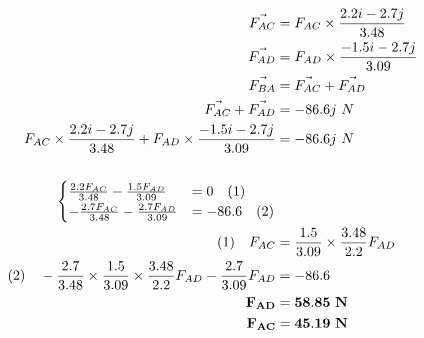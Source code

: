 \documentclass{article}
\begin{document}
\begin{align*}
    \vec{F_{AC}}                                                                                           & = F_{AC} \times \frac{2.2i-2.7j}{3.48}         \\
    \vec{F_{AD}}                                                                                           & = F_{AD} \times \frac{-1.5i-2.7j}{3.09}        \\
    \vec{F_{BA}}                                                                                           & =  \vec{F_{AC}} + \vec{F_{AD}}                 \\
    \vec{F_{AC}} + \vec{F_{AD}}                                                                            & =  -86.6j\ N                                   \\
    F_{AC} \times \frac{2.2i-2.7j}{3.48} + F_{AD} \times \frac{-1.5i-2.7j}{3.09}                           & = -86.6j\ N                                    \\ \hrulefill \\
    \begin{cases}
        \frac{2.2F_{AC}}{3.48} - \frac{1.5F_{AD}}{3.09}  & = 0\quad(1)     \\
        -\frac{2.7F_{AC}}{3.48} - \frac{2.7F_{AD}}{3.09} & = -86.6\quad(2)
    \end{cases}                                              \\
    (1)\quad F_{AC}                                                                                        & =\frac{1.5}{3.09}\times\frac{3.48}{2.2} F_{AD} \\
    (2)\quad -\frac{2.7}{3.48}\times\frac{1.5}{3.09}\times\frac{3.48}{2.2} F_{AD} - \frac{2.7}{3.09}F_{AD} & = -86.6                                        \\
    \mathbf{F_{AD}}                                                                                        & =  \mathbf{58.85\ N}                           \\
    \mathbf{F_{AC}}                                                                                        & =  \mathbf{45.19\ N}                           \\
\end{align*}
\end{document}
